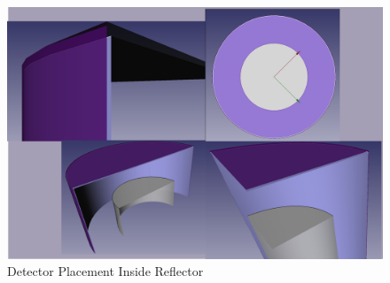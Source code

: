 \begin{figure}[H]
\centering
\includegraphics[width=0.6\linewidth]{figures/detector-layoutv2.png}
\caption{Detector Placement Inside Reflector}
\label{fig:det-place}
\end{figure}